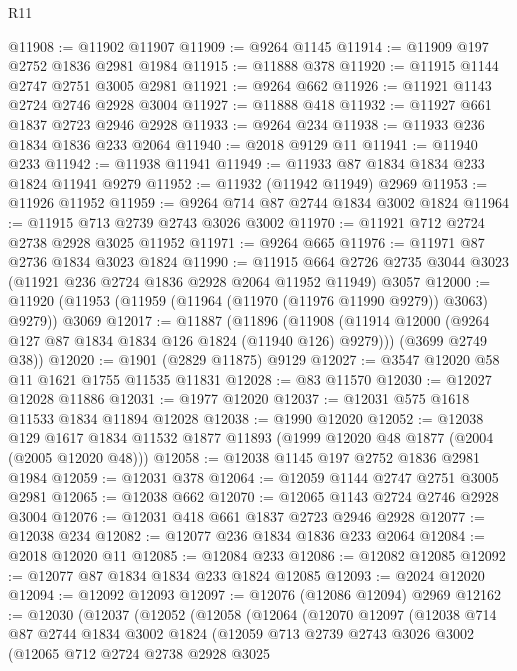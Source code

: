 \begin{lexlean}{R11}
\begin{coremodule}
@11908 := @11902 @11907
@11909 := @9264 @1145
@11914 := @11909 @197 @2752 @1836 @2981 @1984
@11915 := @11888 @378
@11920 := @11915 @1144 @2747 @2751 @3005 @2981
@11921 := @9264 @662
@11926 := @11921 @1143 @2724 @2746 @2928 @3004
@11927 := @11888 @418
@11932 := @11927 @661 @1837 @2723 @2946 @2928
@11933 := @9264 @234
@11938 := @11933 @236 @1834 @1836 @233 @2064
@11940 := @2018 @9129 @11
@11941 := @11940 @233
@11942 := @11938 @11941
@11949 := @11933 @87 @1834 @1834 @233 @1824 @11941 @9279
@11952 := @11932 (@11942 @11949) @2969
@11953 := @11926 @11952
@11959 := @9264 @714 @87 @2744 @1834 @3002 @1824
@11964 := @11915 @713 @2739 @2743 @3026 @3002
@11970 := @11921 @712 @2724 @2738 @2928 @3025 @11952
@11971 := @9264 @665
@11976 := @11971 @87 @2736 @1834 @3023 @1824
@11990 := @11915
    @664
    @2726
    @2735
    @3044
    @3023
    (@11921 @236 @2724 @1836 @2928 @2064 @11952 @11949)
    @3057
@12000 := @11920 (@11953 (@11959 (@11964 (@11970 (@11976 @11990 @9279)) @3063) @9279)) @3069
@12017 := @11887
    (@11896
      (@11908 (@11914 @12000 (@9264 @127 @87 @1834 @1834 @126 @1824 (@11940 @126) @9279)))
      (@3699 @2749 @38))
@12020 := @1901 (@2829 @11875) @9129
@12027 := @3547 @12020 @58 @11 @1621 @1755 @11535 @11831
@12028 := @83 @11570
@12030 := @12027 @12028 @11886
@12031 := @1977 @12020
@12037 := @12031 @575 @1618 @11533 @1834 @11894 @12028
@12038 := @1990 @12020
@12052 := @12038
    @129
    @1617
    @1834
    @11532
    @1877
    @11893
    (@1999 @12020 @48 @1877 (@2004 (@2005 @12020 @48)))
@12058 := @12038 @1145 @197 @2752 @1836 @2981 @1984
@12059 := @12031 @378
@12064 := @12059 @1144 @2747 @2751 @3005 @2981
@12065 := @12038 @662
@12070 := @12065 @1143 @2724 @2746 @2928 @3004
@12076 := @12031 @418 @661 @1837 @2723 @2946 @2928
@12077 := @12038 @234
@12082 := @12077 @236 @1834 @1836 @233 @2064
@12084 := @2018 @12020 @11
@12085 := @12084 @233
@12086 := @12082 @12085
@12092 := @12077 @87 @1834 @1834 @233 @1824 @12085
@12093 := @2024 @12020
@12094 := @12092 @12093
@12097 := @12076 (@12086 @12094) @2969
@12162 := @12030
    (@12037
      (@12052
        (@12058
          (@12064
            (@12070
              @12097
              (@12038
                @714
                @87
                @2744
                @1834
                @3002
                @1824
                (@12059
                  @713
                  @2739
                  @2743
                  @3026
                  @3002
                  (@12065
                    @712
                    @2724
                    @2738
                    @2928
                    @3025

\end{coremodule}
\end{lexlean}
